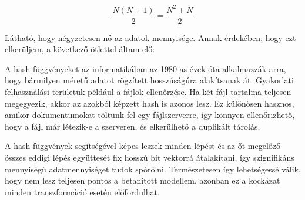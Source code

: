 \[\frac{N(N+1)}{2} = \frac{N^2+N}{2}\]

Látható, hogy négyzetesen nő az adatok mennyisége. Annak érdekében, hogy ezt elkerüljem, a következő ötlettel áltam elő:

A hash-függvényeket az informatikában az 1980-as évek óta alkalmazzák arra, hogy bármilyen méretű adatot rögzített hosszúságúra alakítsanak át. 
Gyakorlati felhasználási területük például a fájlok ellenőrzése. Ha két fájl tartalma teljesen megegyezik, akkor az azokból képzett hash is azonos lesz. Ez különösen hasznos, amikor dokumentumokat töltünk fel egy fájlszerverre, így könnyen ellenőrizhető, hogy a fájl már létezik-e a szerveren, és elkerülhető a duplikált tárolás.

A hash-függvények segítségével képes leszek minden lépést és az őt megelőző összes eddigi lépés együttesét fix hosszú bit vektorrá átalakítani, így szignifikáns mennyiségű adatmennyiséget tudok spórólni. 
Természetesen így lehetségessé válik, hogy nem lesz teljesen pontos a betanított modellem, azonban ez a kockázat minden transzformáció esetén előfordulhat. 

